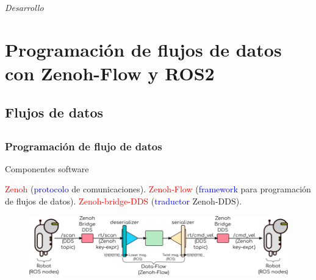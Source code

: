 \documentclass{beamer}
\begin{document}

\section*{}
\begin{frame}{}
  \centering \Huge
  \emph{Desarrollo}
\end{frame}

\section{Programación de flujos de datos con Zenoh-Flow y ROS2}
\subsection{Flujos de datos}



\subsection*{}
\begin{frame}
\frametitle{Programación de flujo de datos}
\begin{block}{Componentes software}
\begin{outline}
\1 \textcolor{red}{Zenoh}            (\textcolor{blue}{protocolo} de comunicaciones).
\1 \textcolor{red}{Zenoh-Flow}       (\textcolor{blue}{framework} para programación de flujos de datos).
\1 \textcolor{red}{Zenoh-bridge-DDS} (\textcolor{blue}{traductor} Zenoh-DDS).
\end{outline}
\end{block}
\begin{figure}
\centering
\includegraphics[width=12.0cm]{figs/zenoh_dds_topology.png}
\end{figure}
\end{frame}
\end{document}
